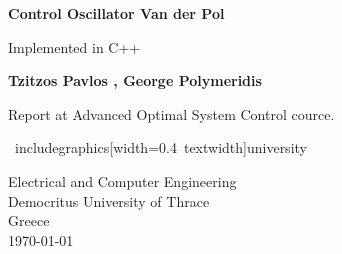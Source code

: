 \begin{titlepage}
    \begin{center}
        \vspace*{1cm}

        \textbf{Control Oscillator Van der Pol}
        
        \vspace{0.5cm}
        
        Implemented in C++
        
        \vspace{1.5cm}
        
        \textbf{Tzitzos Pavlos , George Polymeridis}
        
        \vfill
        
        Report at Advanced Optimal System Control cource.
        
        \vspace{0.8cm}
        
        \ includegraphics[width=0.4\ textwidth]{university}
        
        Electrical and Computer Engineering \\
        Democritus University of Thrace \\
        Greece \\
        \today \\

    \end{center}
\end{titlepage}